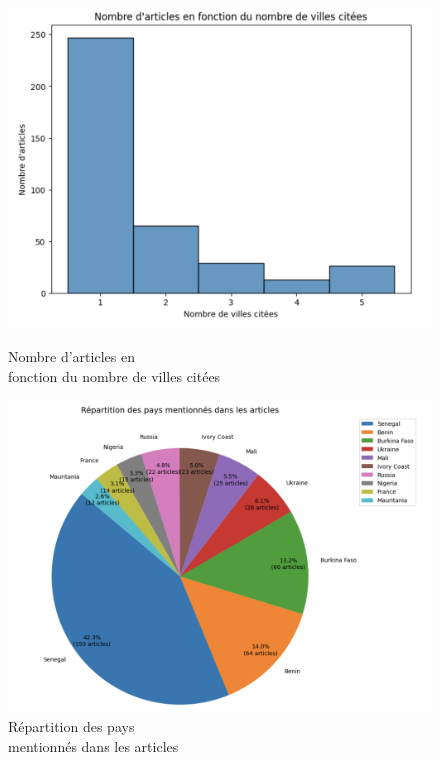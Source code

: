 \documentclass{article}
\begin{document}
\begin{figure}[h]
    \centering
    \begin{minipage}{.5\textwidth}
        \centering
        \includegraphics[width=1\linewidth]{nbarticles.png}
            \caption{Nombre d'articles en \\fonction du nombre de villes citées}
    \end{minipage}%
    \begin{minipage}{.5\textwidth}
        \centering
        \includegraphics[width=1\linewidth]{Tp10.png}
            \caption{Répartition des pays \\mentionnés dans les articles}
    \end{minipage}
\end{figure}
\end{document}

